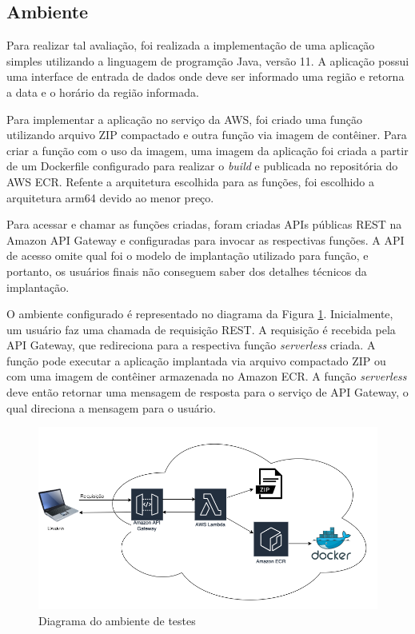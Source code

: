 \documentclass[conference]{IEEEtran}
\begin{document}
\subsection{Ambiente}
\label{subsec:environment}

Para realizar tal avaliação, foi realizada a implementação de uma aplicação simples utilizando a linguagem de programção Java, versão 11. A aplicação possui uma interface de entrada de dados onde deve ser informado uma região e retorna a data e o horário da região informada.

Para implementar a aplicação no serviço da AWS, foi criado uma função utilizando arquivo ZIP compactado e outra função via imagem de contêiner. Para criar a função com o uso da imagem, uma imagem da aplicação foi criada a partir de um Dockerfile configurado para realizar o \textit{build} e publicada no repositória do AWS ECR. Refente a arquitetura escolhida para as funções, foi escolhido a arquitetura arm64 devido ao menor preço.

Para acessar e chamar as funções criadas, foram criadas APIs públicas REST na Amazon API Gateway e configuradas para invocar as respectivas funções. A API de acesso omite qual foi o modelo de implantação utilizado para função, e portanto, os usuários finais não conseguem saber dos detalhes técnicos da implantação.

O ambiente configurado é representado no diagrama da Figura \ref{fig:env_diagram}. Inicialmente, um usuário faz uma chamada de requisição REST. A requisição é recebida pela API Gateway, que redireciona para a respectiva função \textit{serverless} criada. A função pode executar a aplicação implantada via arquivo compactado ZIP ou com uma imagem de contêiner armazenada no Amazon ECR. A função \textit{serverless} deve então retornar uma mensagem de resposta para o serviço de API Gateway, o qual direciona a mensagem para o usuário.

\begin{figure}[H]
    \centering 
    \includegraphics [width=\linewidth]{images/environment-diagram-PT.png}
    \par
    \caption{Diagrama do ambiente de testes}
    \label{fig:env_diagram}
\end{figure}
\end{document}
